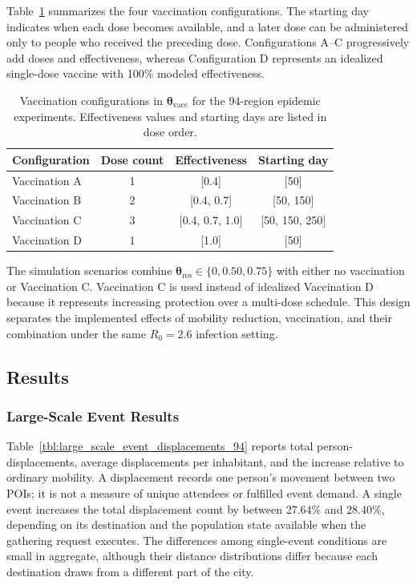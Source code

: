 Table~\ref{tbl:vaccine_configuration_94} summarizes the four vaccination configurations. The starting day indicates when each dose becomes available, and a later dose can be administered only to people who received the preceding dose. Configurations A--C progressively add doses and effectiveness, whereas Configuration D represents an idealized single-dose vaccine with 100\% modeled effectiveness.

\begin{table}[ht]
\centering
\caption{Vaccination configurations in $\bm{\theta}_{\mathrm{vacc}}$ for the 94-region epidemic experiments. Effectiveness values and starting days are listed in dose order.}
\label{tbl:vaccine_configuration_94}
\begin{tabular}{@{}lccc@{}}
\toprule
\textbf{Configuration} & \textbf{Dose count} & \textbf{Effectiveness} & \textbf{Starting day} \\
\midrule
Vaccination A & 1 & [0.4] & [50] \\
Vaccination B & 2 & [0.4, 0.7] & [50, 150] \\
Vaccination C & 3 & [0.4, 0.7, 1.0] & [50, 150, 250] \\
Vaccination D & 1 & [1.0] & [50] \\
\bottomrule
\end{tabular}
\end{table}

The simulation scenarios combine $\bm{\theta}_{\mathrm{res}}\in\{0,0.50,0.75\}$ with either no vaccination or Vaccination C. Vaccination C is used instead of idealized Vaccination D because it represents increasing protection over a multi-dose schedule. This design separates the implemented effects of mobility reduction, vaccination, and their combination under the same $R_0=2.6$ infection setting.%

\subsection{Results}
\label{sec:large_scale_epidemic_results}

\subsubsection{Large-Scale Event Results}

Table~\ref{tbl:large_scale_event_displacements_94} reports total person-displacements, average displacements per inhabitant, and the increase relative to ordinary mobility. A displacement records one person's movement between two POIs; it is not a measure of unique attendees or fulfilled event demand. A single event increases the total displacement count by between 27.64\% and 28.40\%, depending on its destination and the population state available when the gathering request executes. The differences among single-event conditions are small in aggregate, although their distance distributions differ because each destination draws from a different part of the city.

